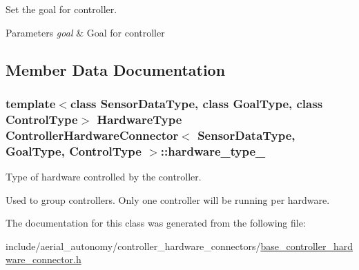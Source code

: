 Set the goal for controller. 


\begin{DoxyParams}{Parameters}
{\em goal} & Goal for controller \\
\hline
\end{DoxyParams}


\subsection{Member Data Documentation}
\hypertarget{classControllerHardwareConnector_a1e47c12f796c9cc2fcb5c2495ede2392}{
\subsubsection[{hardware\-\_\-type\-\_\-}]{\setlength{\rightskip}{0pt plus 5cm}template$<$class Sensor\-Data\-Type, class Goal\-Type, class Control\-Type$>$ {\bf Hardware\-Type} {\bf Controller\-Hardware\-Connector}$<$ Sensor\-Data\-Type, Goal\-Type, Control\-Type $>$\-::hardware\-\_\-type\-\_\-\hspace{0.3cm}{\ttfamily [protected]}}}\label{classControllerHardwareConnector_a1e47c12f796c9cc2fcb5c2495ede2392}


Type of hardware controlled by the controller. 

Used to group controllers. Only one controller will be running per hardware. 

The documentation for this class was generated from the following file\-:\begin{DoxyCompactItemize}
\item 
include/aerial\-\_\-autonomy/controller\-\_\-hardware\-\_\-connectors/\hyperlink{base__controller__hardware__connector_8h}{base\-\_\-controller\-\_\-hardware\-\_\-connector.\-h}\end{DoxyCompactItemize}

